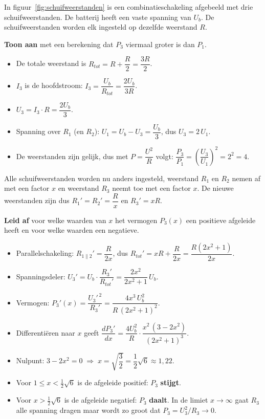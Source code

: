 \documentclass[addpoints,11pt,a4paper]{exam}
\begin{document}
\begin{questions}
In figuur~\ref{fig:schuifweerstanden} is een combinatieschakeling afgebeeld met drie schuifweerstanden. De batterij heeft een vaste spanning van $U_b$. De schuifweerstanden worden elk ingesteld op dezelfde weerstand $R$.

\question[5]
\textbf{Toon aan} met een berekening dat $P_3$ viermaal groter is dan $P_1$.

\begin{solution}
\begin{itemize}
  \item De totale weerstand is $R_{tot} = R + \dfrac{R}{2} = \dfrac{3R}{2}$.
  \item $I_3$ is de hoofdstroom: $I_3 = \dfrac{U_b}{R_{tot}} = \dfrac{2U_b}{3R}$.
  \item $U_3 = I_3 \cdot R = \dfrac{2U_b}{3}$.
  \item Spanning over $R_1$ (en $R_2$): $U_1 = U_b - U_3 = \dfrac{U_b}{3}$, dus $U_3 = 2\,U_1$.
  \item De weerstanden zijn gelijk, dus met $P = \dfrac{U^2}{R}$ volgt: $\dfrac{P_3}{P_1} = \left(\dfrac{U_3}{U_1}\right)^{\!2} = 2^2 = 4$.
\end{itemize}
\end{solution}

\newpage
Alle schuifweerstanden worden nu anders ingesteld, weerstand $R_1$ en $R_2$ nemen af met een factor $x$ en weerstand $R_3$ neemt toe met een factor $x$. De nieuwe weerstanden zijn dus $R_1' = R_2' = \dfrac{R}{x}$ en $R_3' = xR$.

\question[7]
\textbf{Leid af} voor welke waarden van $x$ het vermogen $P_3(x)$ een positieve afgeleide heeft en voor welke waarden een negatieve.

\begin{solution}
\begin{itemize}
  \item Parallelschakeling: $R_{1\parallel 2}' = \dfrac{R}{2x}$, dus $R_{tot}' = xR + \dfrac{R}{2x} = \dfrac{R(2x^2+1)}{2x}$.
  \item Spanningsdeler: $U_3' = U_b \cdot \dfrac{R_3'}{R_{tot}'} = \dfrac{2x^2}{2x^2+1}\,U_b$.
  \item Vermogen: $P_3'(x) = \dfrac{U_3'^{\,2}}{R_3'} = \dfrac{4x^3\,U_b^2}{R\,(2x^2+1)^2}$.
  \item Differentiëren naar $x$ geeft $\dfrac{dP_3'}{dx} = \dfrac{4U_b^2}{R}\cdot \dfrac{x^2\,(3-2x^2)}{(2x^2+1)^3}$.
  \item Nulpunt: $3 - 2x^2 = 0 \;\Rightarrow\; x = \sqrt{\dfrac{3}{2}} = \dfrac{1}{2}\sqrt{6} \approx 1{,}22$.
  \item Voor $1 \leq x < \tfrac{1}{2}\sqrt{6}$ is de afgeleide positief: $P_3$ \textbf{stijgt}.
  \item Voor $x > \tfrac{1}{2}\sqrt{6}$ is de afgeleide negatief: $P_3$ \textbf{daalt}. In de limiet $x \to \infty$ gaat $R_3$ alle spanning dragen maar wordt zo groot dat $P_3 = U_3^2/R_3 \to 0$.
\end{itemize}
\end{solution}


\end{questions}
\end{document}
